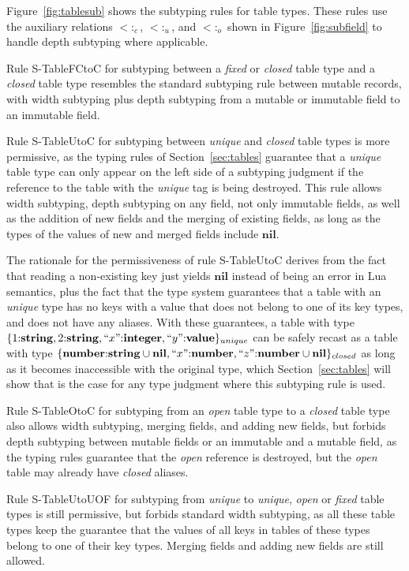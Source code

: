 \documentclass[10pt]{sigplanconf}
\newcommand{\Value}{\mathbf{value}}
\newcommand{\Nil}{\mathbf{nil}}
\newcommand{\Integer}{\mathbf{integer}}
\newcommand{\Number}{\mathbf{number}}
\newcommand{\String}{\mathbf{string}}
\newcommand{\subtype}{<:}
\begin{document}
Figure~\ref{fig:tablesub} shows the subtyping rules for
table types. These rules use the auxiliary relations
$\subtype_{c}$, $\subtype_{u}$, and $\subtype_{o}$
shown in Figure~\ref{fig:subfield} to handle depth
subtyping where applicable.

Rule {\sc S-TableFCtoC} for subtyping
between a {\em fixed} or {\em closed}
table type and a {\em closed} table type resembles the
standard subtyping rule between mutable records, with
width subtyping plus depth subtyping from a mutable
or immutable field to an immutable field.

Rule {\sc S-TableUtoC} for subtyping between {\em unique} and {\em closed} table types is more permissive, as the typing rules of Section~\ref{sec:tables} guarantee that a {\em unique}
table type can only appear on the left side of a subtyping
judgment if the reference to the table with the {\em unique}
tag is being destroyed. This rule allows width subtyping, depth subtyping on any field, not only immutable fields, as well as the addition of new fields and the merging of existing fields, as long as the types of the values of new and merged fields include $\Nil$. 

The rationale for the permissiveness of rule {\sc S-TableUtoC} derives from the fact that reading a non-existing key just yields $\Nil$ instead of being an error in Lua semantics, plus the fact
that the type system guarantees that a table with an
{\em unique} type has no keys with a value that does not
belong to one of its key types, and does not have any
aliases. With these guarantees, a table with type $\{1{:}\String, 2{:}\String,
``x"{:}\Integer, ``y"{:}\Value\}_{unique}$ can be safely recast as a table with type 
$\{\Number{:}\String \cup \Nil, ``x"{:}\Number, ``z"{:}
\Number \cup \Nil\}_{closed}$ as long as it becomes
inaccessible with the original type, which Section~\ref{sec:tables} will show that is the case
for any type judgment where this subtyping rule is used.

Rule {\sc S-TableOtoC} for subtyping from an {\em open} table type to a {\em closed} table type also allows width subtyping, merging fields, and adding new fields, but forbids depth subtyping between mutable fields or an immutable and a mutable field, as the typing rules guarantee that the {\em open} reference
is destroyed, but the {\em open} table may already have {\em closed} aliases.

Rule {\sc S-TableUtoUOF} for subtyping from {\em unique} to {\em unique}, {\em open} or {\em fixed} table types is still permissive, but forbids standard width subtyping, as all these table types keep the guarantee that the values of all keys in tables of these types belong to one of their key types. Merging fields and adding new fields are still allowed.
\end{document}
